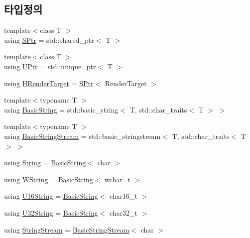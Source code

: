 \subsection*{타입정의}
\begin{DoxyCompactItemize}
\item 
{\footnotesize template$<$class T $>$ }\\using \hyperlink{namespacecpf_a91e72db639307e12a24546a0eebb1a42}{S\+Ptr} = std\+::shared\+\_\+ptr$<$ T $>$
\item 
{\footnotesize template$<$class T $>$ }\\using \hyperlink{namespacecpf_ae8ac5e55927cc357960f1d47c19fe0b9}{U\+Ptr} = std\+::unique\+\_\+ptr$<$ T $>$
\item 
using \hyperlink{namespacecpf_a3f0ea2ea743b0adb7c12e52131d485b5}{H\+Render\+Target} = \hyperlink{namespacecpf_a91e72db639307e12a24546a0eebb1a42}{S\+Ptr}$<$ Render\+Target $>$
\item 
{\footnotesize template$<$typename T $>$ }\\using \hyperlink{namespacecpf_ac91c8c57a370a5bef21ac23f876ad536}{Basic\+String} = std\+::basic\+\_\+string$<$ T, std\+::char\+\_\+traits$<$ T $>$ $>$
\item 
{\footnotesize template$<$typename T $>$ }\\using \hyperlink{namespacecpf_a1fe334b3d2422535a1cfe51785d98cb8}{Basic\+String\+Stream} = std\+::basic\+\_\+stringstream$<$ T, std\+::char\+\_\+traits$<$ T $>$ $>$
\item 
using \hyperlink{namespacecpf_a4dbd6992c3ed4440ce7ed8982ff7ffea}{String} = \hyperlink{namespacecpf_ac91c8c57a370a5bef21ac23f876ad536}{Basic\+String}$<$ char $>$
\item 
using \hyperlink{namespacecpf_ad36115a5fb55fb1cc257eeab6aed2d7a}{W\+String} = \hyperlink{namespacecpf_ac91c8c57a370a5bef21ac23f876ad536}{Basic\+String}$<$ wchar\+\_\+t $>$
\item 
using \hyperlink{namespacecpf_a32926a91098f8ea8d354b9f234b75acc}{U16\+String} = \hyperlink{namespacecpf_ac91c8c57a370a5bef21ac23f876ad536}{Basic\+String}$<$ char16\+\_\+t $>$
\item 
using \hyperlink{namespacecpf_a71279c3a3d59ed723c48245204f8c0e5}{U32\+String} = \hyperlink{namespacecpf_ac91c8c57a370a5bef21ac23f876ad536}{Basic\+String}$<$ char32\+\_\+t $>$
\item 
using \hyperlink{namespacecpf_a6e5583a51165e808f1a480563a2d98b2}{String\+Stream} = \hyperlink{namespacecpf_a1fe334b3d2422535a1cfe51785d98cb8}{Basic\+String\+Stream}$<$ char $>$

\end{DoxyCompactItemize}
